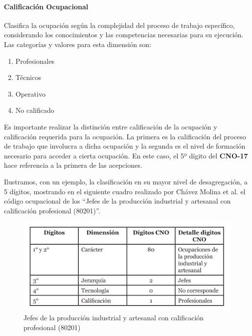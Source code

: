 \documentclass[
]{book}
\providecommand{\tightlist}{%
  \setlength{\itemsep}{0pt}\setlength{\parskip}{0pt}}
\begin{document}
\hypertarget{calificaciuxf3n-ocupacional}{%
\paragraph{Calificación Ocupacional}\label{calificaciuxf3n-ocupacional}}

Clasifica la ocupación según la complejidad del proceso de trabajo específico, considerando los conocimientos y las competencias necesarias para su ejecución. Las categorías y valores para esta dimensión son:

\begin{enumerate}
\def\labelenumi{\arabic{enumi}.}
\tightlist
\item
  Profesionales\\
\item
  Técnicos\\
\item
  Operativo\\
\item
  No calificado
\end{enumerate}

Es importante realizar la distinción entre calificación de la ocupación y calificación requerida para la ocupación. La primera es la calificación del proceso de trabajo que involucra a dicha ocupación y la segunda es el nivel de formación necesario para acceder a cierta ocupación. En este caso, el 5º dígito del \textbf{CNO-17} hace referencia a la primera de las acepciones.

Ilustramos, con un ejemplo, la clasificación en su mayor nivel de desagregación, a 5 dígitos, mostrando en el siguiente cuadro realizado por Chávez Molina et al. \citeyearpar{ChavezMolina.etal2020} el código ocupacional de los ``Jefes de la producción industrial y artesanal con calificación profesional (80201)''.

\begin{figure}

{\centering \includegraphics[width=0.8\linewidth]{imagenes/t5_u4} 

}

\caption{Jefes de la producción industrial y artesanal con calificación profesional (80201)}\label{fig:unnamed-chunk-35}
\end{figure}
\end{document}
